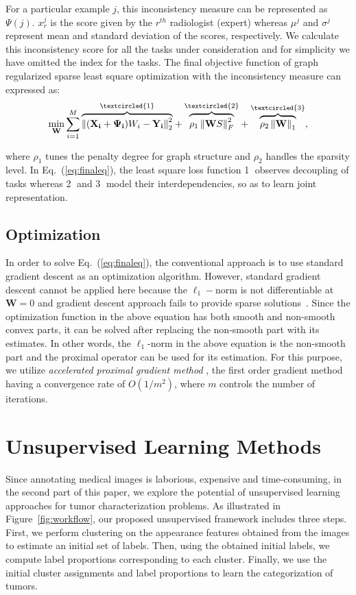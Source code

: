 \documentclass[journal]{IEEEtran}
\DeclareMathOperator*{\minimum}{min}
\begin{document}
For a particular example $j$, this inconsistency measure can be represented as $\Psi(j)$. $x_r^j$ is the score given by the $r^{th}$ radiologist (expert) whereas $\mu^j$ and $\sigma^j$ represent mean and standard deviation of the scores, respectively. We calculate this inconsistency score for all the tasks under consideration and for simplicity we have omitted the index for the tasks. The final objective function of graph regularized sparse least square optimization with the inconsistency measure can expressed as:
\begin{equation}
\minimum_{\mathbf{W}}\sum_{i=1}^{M}\overset{{\textcircled{1}}}{\overbrace{\left \|(\mathbf{X_i}+\mathbf{\Psi_i})W_i-\mathbf{Y_i}  \right \|_{2}^{2}}}+\overset{{\textcircled{2}}}{\overbrace{\rho_1\left \| \mathbf{W}S \right \|_{F}^{2}}}+\overset{{\textcircled{3}}}{\overbrace{\rho_2\left \| \mathbf{W} \right \|_{1}}},
\label{eq:finaleq}
\end{equation}


\noindent where $\rho_1$ tunes the penalty degree for graph structure and $\rho_2$ handles the sparsity level. In Eq.~(\ref{eq:finaleq}), the least square loss function \textcircled{1} observes decoupling of tasks whereas \textcircled{2} and \textcircled{3} model their interdependencies, so as to learn joint representation.

\subsection{Optimization}
In order to solve Eq.~(\ref{eq:finaleq}), the conventional approach is to use standard gradient descent as an optimization algorithm. However, standard gradient descent cannot be applied here because the $\ell_1-$norm is not differentiable at $\mathbf{W}=0$ and gradient descent approach fails to provide sparse solutions~\cite{shalev2011stochastic}. Since the optimization function in the above equation has both smooth and non-smooth convex parts, it can be solved after replacing the non-smooth part with its estimates. In other words, the $\ell_1$-norm in the above equation is the non-smooth part and the proximal operator can be used for its estimation. For this purpose, we utilize \emph{accelerated proximal gradient method} \cite{nesterov2013introductory}, the first order gradient method having a convergence rate of $O(1/m^2)$, where $m$ controls the number of iterations. %

\section{Unsupervised Learning Methods}
Since annotating medical images is laborious, expensive and time-consuming, in the second part of this paper, we explore the potential of unsupervised learning approaches for tumor characterization problems. As illustrated in Figure~\ref{fig:workflow}, our proposed unsupervised framework includes three steps. First, we perform clustering on the appearance features obtained from the images to estimate an initial set of labels. Then, using the obtained initial labels, we compute label proportions corresponding to each cluster. Finally, we use the initial cluster assignments and label proportions to learn the categorization of tumors.
\end{document}
